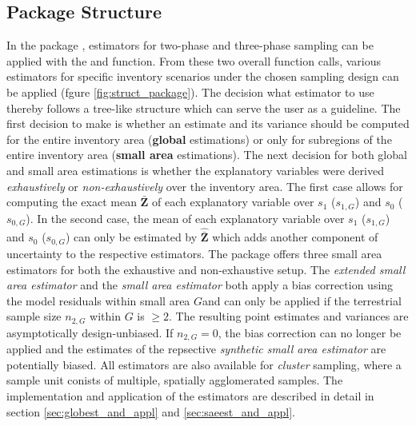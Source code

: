 \documentclass[article]{jss}
\begin{document}
\subsection{Package Structure}

In the  package , estimators for two-phase and three-phase sampling can be applied with the  and  function. From these two overall function calls, various estimators for specific inventory scenarios under the chosen sampling design can be applied (fgure \ref{fig:struct_package}). The decision what estimator to use thereby follows a tree-like structure which can serve the user as a guideline. The first decision to make is whether an estimate and its variance should be computed for the entire inventory area (\textbf{global} estimations) or only for subregions of the entire inventory area (\textbf{small area} estimations). The next decision for both global and small area estimations is whether the explanatory variables were derived \textit{exhaustively} or \textit{non-exhaustively} over the inventory area. The first case allows for computing the exact mean $\bar{\pmb{Z}}$ of each explanatory variable over $s_1$ ($s_{1,G}$) and $s_0$ ($s_{0,G}$). In the second case, the mean of each explanatory variable over $s_1$ ($s_{1,G}$) and $s_0$ ($s_{0,G}$) can only be estimated by $\hat{\bar{\pmb{Z}}}$ which adds another component of uncertainty to the respective estimators. The package offers three small area estimators for both the exhaustive and non-exhaustive setup. The \textit{extended small area estimator} and the \textit{small area estimator} both apply a bias correction using the model residuals within small area $G$and can only be applied if the terrestrial sample size $n_{2,G}$ within $G$ is $\geq 2$. The resulting point estimates and variances are asymptotically design-unbiased. If $n_{2,G}=0$, the bias correction can no longer be applied and the estimates of the repsective \textit{synthetic small area estimator} are potentially biased. All estimators are also available for \textit{cluster} sampling, where a sample unit conists of multiple, spatially agglomerated samples. The implementation and application of the estimators are described in detail in section \ref{sec:globest_and_appl} and \ref{sec:saeest_and_appl}. 

\end{document}
